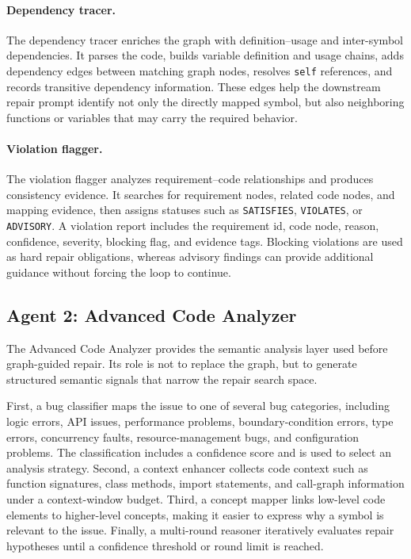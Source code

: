 \documentclass[11pt]{article}
\begin{document}
\paragraph{Dependency tracer.}
The dependency tracer enriches the graph with definition--usage and inter-symbol dependencies.  It parses the code, builds variable definition and usage chains, adds dependency edges between matching graph nodes, resolves \texttt{self} references, and records transitive dependency information.  These edges help the downstream repair prompt identify not only the directly mapped symbol, but also neighboring functions or variables that may carry the required behavior.

\paragraph{Violation flagger.}
The violation flagger analyzes requirement--code relationships and produces consistency evidence.  It searches for requirement nodes, related code nodes, and mapping evidence, then assigns statuses such as \texttt{SATISFIES}, \texttt{VIOLATES}, or \texttt{ADVISORY}.  A violation report includes the requirement id, code node, reason, confidence, severity, blocking flag, and evidence tags.  Blocking violations are used as hard repair obligations, whereas advisory findings can provide additional guidance without forcing the loop to continue.

\subsection{Agent 2: Advanced Code Analyzer}
\label{subsec:advanced-analyzer}

The Advanced Code Analyzer provides the semantic analysis layer used before graph-guided repair.  Its role is not to replace the graph, but to generate structured semantic signals that narrow the repair search space.

First, a bug classifier maps the issue to one of several bug categories, including logic errors, API issues, performance problems, boundary-condition errors, type errors, concurrency faults, resource-management bugs, and configuration problems.  The classification includes a confidence score and is used to select an analysis strategy.  Second, a context enhancer collects code context such as function signatures, class methods, import statements, and call-graph information under a context-window budget.  Third, a concept mapper links low-level code elements to higher-level concepts, making it easier to express why a symbol is relevant to the issue.  Finally, a multi-round reasoner iteratively evaluates repair hypotheses until a confidence threshold or round limit is reached.
\end{document}
